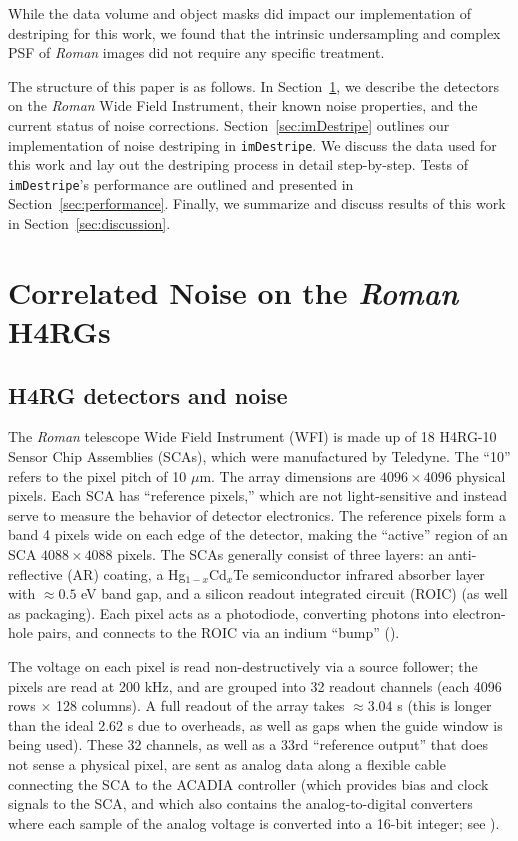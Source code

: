\documentclass[]{pasj01}
\begin{document}
While the data volume and object masks did impact our implementation of destriping for this work, we found that the intrinsic undersampling and complex PSF of \textit{Roman} images did not require any specific treatment.

The structure of this paper is as follows. In Section~\ref{sec:detectors}, we describe the detectors on the \textit{Roman} Wide Field Instrument, their known noise properties, and the current status of noise corrections. 
Section~\ref{sec:imDestripe} outlines our implementation of noise destriping in \texttt{imDestripe}. We discuss the data used for this work and lay out the destriping process in detail step-by-step.
Tests of \texttt{imDestripe}'s performance are outlined and presented in Section~\ref{sec:performance}. Finally, we summarize and discuss results of this work in Section~\ref{sec:discussion}.

\section{Correlated Noise on the \textit{Roman} H4RGs}\label{sec:detectors}

\subsection{H4RG detectors and noise}

The \textit{Roman} telescope Wide Field Instrument (WFI) is made up of 18 H4RG-10 Sensor Chip Assemblies (SCAs), which were manufactured by Teledyne. The ``10'' refers to the pixel pitch of 10 $\mu$m. The array dimensions are $4096\times 4096$ physical pixels. Each SCA has ``reference pixels,'' which are not light-sensitive and instead serve to measure the behavior of detector electronics. The reference pixels form a band 4 pixels wide on each edge of the detector, making the ``active'' region of an SCA $4088\times4088$ pixels. The SCAs generally consist of three layers: an anti-reflective (AR) coating, a Hg$_{1-x}$Cd$_x$Te semiconductor infrared absorber layer with $\approx 0.5$ eV band gap, and a silicon readout integrated circuit (ROIC) (as well as packaging). Each pixel acts as a photodiode, converting photons into electron-hole pairs, and connects to the ROIC via an indium ``bump'' (\cite{Mosby2020}). 

The voltage on each pixel is read non-destructively via a source follower; the pixels are read at 200 kHz, and are grouped into 32 readout channels (each 4096 rows $\times$ 128 columns). A full readout of the array takes $\approx 3.04$ s (this is longer than the ideal 2.62 s due to overheads, as well as gaps when the guide window is being used). These 32 channels, as well as a 33rd ``reference output'' that does not sense a physical pixel, are sent as analog data along a flexible cable connecting the SCA to the ACADIA controller (which provides bias and clock signals to the SCA, and which also contains the analog-to-digital converters where each sample of the analog voltage is converted into a 16-bit integer; see \cite{Loose2018}).
\end{document}

